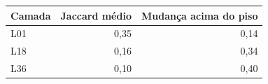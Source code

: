 \begin{tabular}{lrr}
\toprule
Camada & Jaccard médio & Mudança acima do piso \\
\midrule
L01 & 0,35 & 0,14 \\
L18 & 0,16 & 0,34 \\
L36 & 0,10 & 0,40 \\
\bottomrule
\end{tabular}
